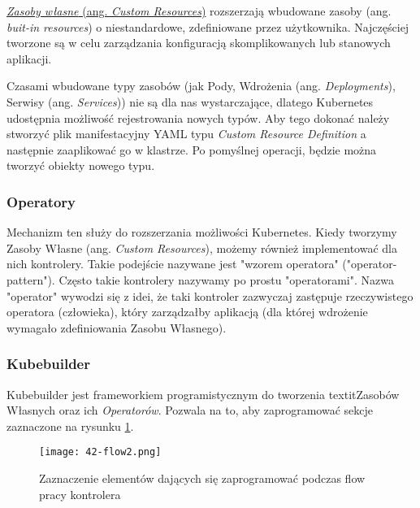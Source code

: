 \hyperlink{def:zasoby-wlasne}{\textit{Zasoby własne} (ang. \textit{Custom Resources})} rozszerzają wbudowane zasoby (ang. \textit{buit-in resources}) o niestandardowe, zdefiniowane przez użytkownika. Najczęściej tworzone są w celu zarządzania konfiguracją skomplikowanych lub stanowych aplikacji. 

Czasami wbudowane typy zasobów (jak Pody, Wdrożenia (ang. \textit{Deployments}), Serwisy (ang. \textit{Services})) nie są dla nas wystarczające, dlatego Kubernetes udostępnia możliwość rejestrowania nowych typów. Aby tego dokonać należy stworzyć plik manifestacyjny YAML typu \textit{Custom Resource Definition} a następnie zaaplikować go w klastrze. Po pomyślnej operacji, będzie można tworzyć obiekty nowego typu.

\subsubsection{Operatory}

Mechanizm ten służy do rozszerzania możliwości Kubernetes. Kiedy tworzymy Zasoby Własne (ang. \textit{Custom Resources}), możemy również implementować dla nich kontrolery. Takie podejście nazywane jest "wzorem operatora" ("operator-pattern"). Często takie kontrolery nazywamy po prostu "operatorami". Nazwa "operator" wywodzi się z idei, że taki kontroler zazwyczaj zastępuje rzeczywistego operatora (człowieka), który zarządzałby aplikacją (dla której wdrożenie wymagało zdefiniowania Zasobu Własnego).

\subsubsection{Kubebuilder}

Kubebuilder jest frameworkiem programistycznym do tworzenia textit{Zasobów Własnych} oraz ich \textit{Operatorów}. Pozwala na to, aby zaprogramować sekcje zaznaczone na rysunku \ref{fig:42-flow2}.


\begin{figure}[!h]
    \centering \texttt{[image: 42-flow2.png]}
    \caption{Zaznaczenie elementów dających się zaprogramować podczas flow pracy kontrolera}\label{fig:42-flow2}
\end{figure}